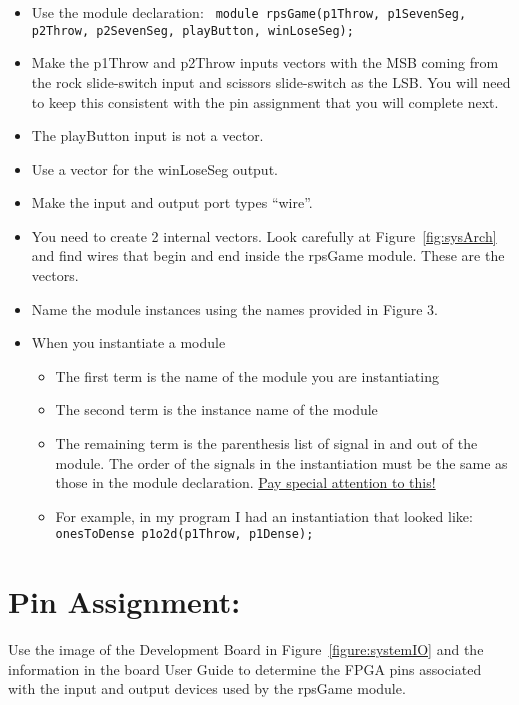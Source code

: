 \begin{itemize}
\item
  Use the module declaration: \newline
   \verb+ module rpsGame(p1Throw, p1SevenSeg, p2Throw, p2SevenSeg, playButton, winLoseSeg);+

\item
  Make the p1Throw and p2Throw inputs vectors with the MSB coming from
  the rock slide-switch input and scissors slide-switch as the LSB. You
  will need to keep this consistent with the pin assignment that you
  will complete next.
\item
  The playButton input is not a vector.
\item
  Use a vector for the winLoseSeg output.
\item
  Make the input and output port types ``wire''.
\item
  You need to create 2 internal vectors. Look carefully at Figure~\ref{fig:sysArch} and
  find wires that begin and end inside the rpsGame module. These are the
  vectors.
\item
  Name the module instances using the names provided in Figure 3.
\item
  When you instantiate a module

  \begin{itemize}
  \item
    The first term is the name of the module you are instantiating
  \item
    The second term is the instance name of the module
  \item
    The remaining term is the parenthesis list of signal in and out of
    the module. The order of the signals in the instantiation must be
    the same as those in the module declaration. \uline{Pay special
    attention to this!}
  \item
    For example, in my program I had an instantiation that looked like: \\
   \verb+onesToDense p1o2d(p1Throw, p1Dense);+
  \end{itemize}
\end{itemize}


\hypertarget{pin-assignment}{%
\section{Pin Assignment:}\label{pin-assignment}}

Use the image of the Development Board in Figure~\ref{figure:systemIO} and the information
in the board User Guide to determine the FPGA pins associated with the
input and output devices used by the rpsGame module.

